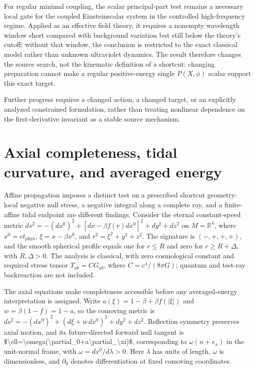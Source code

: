 \documentclass[11pt]{article}
\begin{document}
For regular minimal coupling, the scalar principal-part test remains a necessary local gate for the coupled Einstein\textendash{}scalar system in the controlled high-frequency regime. Applied as an effective field theory, it requires a nonempty wavelength window short compared with background variation but still below the theory\textquoteright{}s cutoff; without that window, the conclusion is restricted to the exact classical model rather than unknown ultraviolet dynamics. The result therefore changes the source search, not the kinematic definition of a shortcut: changing preparation cannot make a regular positive-energy single $P(X,\phi)$ scalar support this exact target.

Further progress requires a changed action, a changed target, or an explicitly analyzed constrained formulation, rather than treating nonlinear dependence on the first-derivative invariant as a stable source mechanism.

\section{Axial completeness, tidal curvature, and averaged energy}
Affine propagation imposes a distinct test on a prescribed shortcut geometry: local negative null stress, a negative integral along a complete ray, and a finite-affine tidal endpoint are different findings. Consider the eternal constant-speed metric $ds^2=-(dx^0)^2+[dx-\beta f(r)dx^0]^2+dy^2+dz^2$ on $M=\mathbb{R}^4$, where $x^0=ct_{\mathrm{phys}}$, $\xi=x-\beta x^0$, and $r^2=\xi^2+y^2+z^2$. The signature is $(-,+,+,+)$, and the smooth spherical profile equals one for $r\leq R$ and zero for $r\geq R+\Delta$, with $R,\Delta>0$. The analysis is classical, with zero cosmological constant and required stress tensor $T_{ab}=C G_{ab}$, where $C=c^4/(8\pi G)$; quantum and test-ray backreaction are not included.

The axial equations make completeness accessible before any averaged-energy interpretation is assigned. Write $a(\xi)=1-\beta+\beta f(|\xi|)$ and $w=\beta(1-f)=1-a$, so the comoving metric is $ds^2=-(dx^0)^2+(d\xi+w\,dx^0)^2+dy^2+dz^2$. Reflection symmetry preserves axial motion, and its future-directed forward null tangent is \$\textbackslash{}ell=\textbackslash{}omega(\textbackslash{}partial\_0+a\textbackslash{}partial\_\textbackslash{}xi)\$, corresponding to $\omega(n+e_x)$ in the unit-normal frame, with $\omega=dx^0/d\lambda>0$. Here $\lambda$ has units of length, $\omega$ is dimensionless, and $\partial_0$ denotes differentiation at fixed comoving coordinates.
\end{document}
